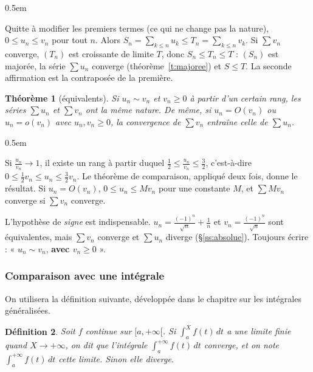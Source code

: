\documentclass[a4paper,11pt]{article}
\makeatletter
\numberwithin{equation}{section}
\numberwithin{figure}{section}
\numberwithin{table}{section}
\theoremstyle{enonce}
\newtheorem{definition}{Définition}[section]
\newtheorem{theoreme}[definition]{Théorème}
\theoremstyle{exemple}
\theoremstyle{remarque}
\renewcommand{\proofname}{Démonstration}
\renewenvironment{proof}[1][\proofname]{\par\pushQED{\qed}\normalfont
  \topsep0.5em\relax\trivlist\item[\hskip\labelsep\sffamily\itshape\color{Gris}#1.]\ignorespaces}
  {\popQED\endtrivlist\@endpefalse}
\makeatother
\begin{document}
\begin{proof}
Quitte à modifier les premiers termes (ce qui ne change pas la nature), $0\leq u_n\leq v_n$ pour tout $n$. Alors
$S_n=\sum_{k\leq n}u_k\leq T_n=\sum_{k\leq n}v_k$. Si $\sum v_n$ converge, $(T_n)$ est croissante de limite $T$, donc
$S_n\leq T_n\leq T$ : $(S_n)$ est majorée, la série $\sum u_n$ converge (théorème~\ref{t:majoree}) et $S\leq T$. La seconde
affirmation est la contraposée de la première.
\end{proof}

\begin{theoreme}[équivalents]\label{t:equivalents}
Si $u_n\sim v_n$ et $v_n\geq0$ à partir d'un certain rang, les séries $\sum u_n$ et $\sum v_n$ ont la même nature.
De même, si $u_n=O(v_n)$ ou $u_n=o(v_n)$ avec $u_n,v_n\geq0$, la convergence de $\sum v_n$ entraîne celle de $\sum u_n$.
\end{theoreme}

\begin{proof}
Si $\frac{u_n}{v_n}\to1$, il existe un rang à partir duquel $\frac12\leq\frac{u_n}{v_n}\leq\frac32$, c'est-à-dire
$0\leq\frac12v_n\leq u_n\leq\frac32v_n$. Le théorème de comparaison, appliqué deux fois, donne le résultat. Si $u_n=O(v_n)$,
$0\leq u_n\leq Mv_n$ pour une constante $M$, et $\sum Mv_n$ converge si $\sum v_n$ converge.
\end{proof}

\begin{attention}
L'hypothèse de \emph{signe} est indispensable. $u_n=\frac{(-1)^n}{\sqrt n}+\frac1n$ et $v_n=\frac{(-1)^n}{\sqrt n}$ sont
équivalentes, mais $\sum v_n$ converge et $\sum u_n$ diverge (§\ref{ss:absolue}). Toujours écrire : « $u_n\sim v_n$, \textbf{avec
$v_n\geq0$} ».
\end{attention}

\subsubsection*{Comparaison avec une intégrale}

On utilisera la définition suivante, développée dans le chapitre sur les intégrales généralisées.

\begin{definition}
Soit $f$ continue sur $[a,+\infty[$. Si $\int_a^Xf(t)\,dt$ a une limite finie quand $X\to+\infty$, on dit que l'intégrale
$\int_a^{+\infty}f(t)\,dt$ \emph{converge}, et on note $\int_a^{+\infty}f(t)\,dt$ cette limite. Sinon elle \emph{diverge}.
\end{definition}
\end{document}
